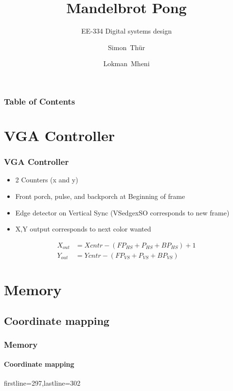 \documentclass{beamer}
\title{Mandelbrot Pong}
\subtitle{EE-334 Digital systems design}
\author[Thür, Mheni] 
	{Simon~Thür \and Lokman~Mheni}
\institute[EPFL]{EPFL SEL-BA5}
\begin{document}
\frame {
    \titlepage
}

\begin{frame}
    \frametitle{Table of Contents}
    \tableofcontents[currentsection]
\end{frame}


\section{VGA Controller}
\begin{frame}
    \sectionpage
\end{frame}

\begin{frame}
    \frametitle{VGA Controller}
    \begin{itemize}
        \item 2 Counters (x and y)
        \item Front porch, pulse, and backporch at Beginning of frame
        \item Edge detector on Vertical Sync (VSedgexSO corresponds to new frame)
        \item X,Y output corresponds to next color wanted
    \end{itemize}

    \begin{equation}
        \begin{split}
            X_{out} &= X{cntr} - (FP_{HS} + P_{HS} + BP_{HS})+1\\
            Y_{out} &= Y{cntr} - (FP_{VS} + P_{VS} + BP_{VS})
        \end{split}
    \end{equation}
\end{frame}


\section{Memory}
\begin{frame}
    \sectionpage
\end{frame}

\subsection{Coordinate mapping}
\begin{frame}[fragile]
    \frametitle{Memory}
    \framesubtitle{Coordinate mapping}
    
    firstline=297,lastline=302

\end{frame}
\end{document}
